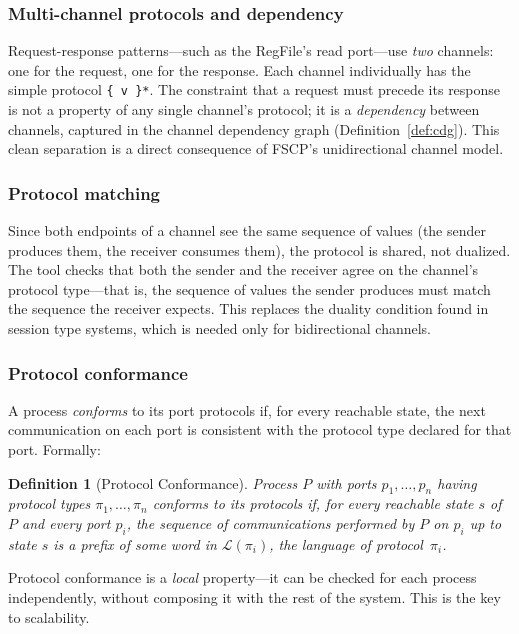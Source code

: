 \documentclass[11pt]{article}
\newtheorem{definition}[theorem]{Definition}
\begin{document}
\subsubsection{Multi-channel protocols and dependency}

Request-response patterns---such as the RegFile's read port---use
\emph{two} channels: one for the request, one for the response.
Each channel individually has the simple protocol \texttt{\{ v \}*}.
The constraint that a request must precede its response is not a
property of any single channel's protocol; it is a \emph{dependency}
between channels, captured in the channel dependency graph
(Definition~\ref{def:cdg}).  This clean separation is a direct
consequence of FSCP's unidirectional channel model.

\subsubsection{Protocol matching}

Since both endpoints of a channel see the same sequence of values (the
sender produces them, the receiver consumes them), the protocol is
shared, not dualized.  The tool checks that both the sender and the
receiver agree on the channel's protocol type---that is, the sequence
of values the sender produces must match the sequence the receiver
expects.  This replaces the duality condition found in session type
systems, which is needed only for bidirectional channels.

\subsubsection{Protocol conformance}

A process \emph{conforms} to its port protocols if, for every
reachable state, the next communication on each port is consistent
with the protocol type declared for that port.  Formally:

\begin{definition}[Protocol Conformance]
\label{def:conformance}
Process $P$ with ports $p_1, \ldots, p_n$ having protocol types
$\pi_1, \ldots, \pi_n$ \emph{conforms} to its protocols if, for every
reachable state $s$ of $P$ and every port $p_i$, the sequence of
communications performed by $P$ on $p_i$ up to state $s$ is a prefix
of some word in $\mathcal{L}(\pi_i)$, the language of protocol~$\pi_i$.
\end{definition}

Protocol conformance is a \emph{local} property---it can be checked
for each process independently, without composing it with the rest of
the system.  This is the key to scalability.
\end{document}
